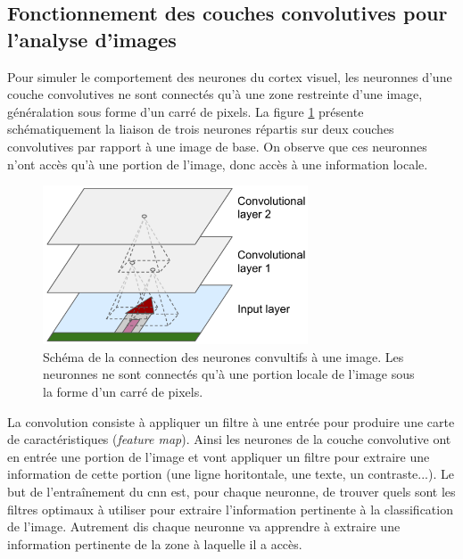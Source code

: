 \subsection{Fonctionnement des couches convolutives pour l'analyse d'images}
Pour simuler le comportement des neurones du cortex visuel, les neuronnes d'une couche convolutives ne sont connectés qu'à une zone restreinte d'une image, généralation sous forme d'un carré de pixels. La figure \ref{fig:conv_simple} présente schématiquement la liaison de trois neurones répartis sur deux couches convolutives par rapport à une image de base. On observe que ces neuronnes n'ont accès qu'à une portion de l'image, donc accès à une information locale. 
\begin{figure}[!htbp]
 \centering
 \includegraphics[width=0.7\textwidth]{figures/conv_simple.png}
 \caption[Schéma de la connection des neurones convultifs à une image]{Schéma de la connection des neurones convultifs à une image. Les neuronnes ne sont connectés qu'à une portion locale de l'image sous la forme d'un carré de pixels.}
 \label{fig:conv_simple}
\end{figure}
La convolution consiste à appliquer un filtre à une entrée pour produire une carte de caractéristiques (\textit{feature map}). Ainsi les neurones de la couche convolutive ont en entrée une portion de l'image et vont appliquer un filtre pour extraire une information de cette portion (une ligne horitontale, une texte, un contraste...). Le but de l'entraînement du \gls{cnn} est, pour chaque neuronne, de trouver quels sont les filtres optimaux à utiliser pour extraire l'information pertinente à la classification de l'image. Autrement dis chaque neuronne va apprendre à extraire une information pertinente de la zone à laquelle il a accès.

